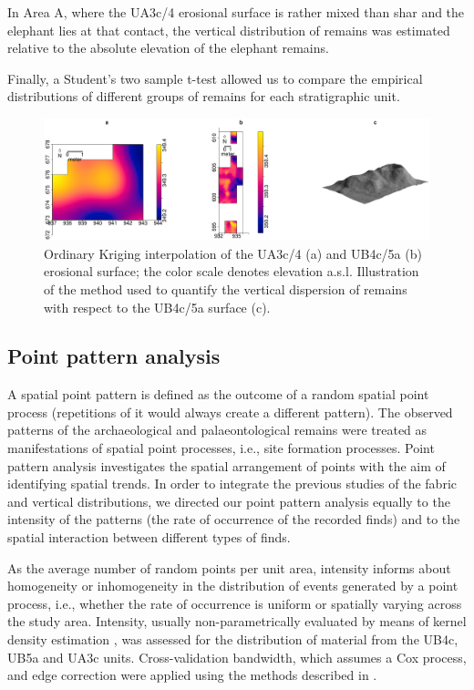\documentclass[preprint,authoryear,times]{elsarticle} %
\begin{document}
In Area A, where the UA3c/4 erosional surface is rather mixed than shar and the elephant lies at that contact, the vertical distribution of remains was estimated relative to the absolute elevation of the elephant remains.

Finally, a Student's two sample t-test allowed us to compare the empirical distributions of different groups of remains for each stratigraphic unit.

\begin{figure}[]
  \centering
  \includegraphics[width=1\textwidth]{../artwork/Fig5.eps}
  \caption{Ordinary Kriging interpolation of the UA3c/4 (a) and UB4c/5a (b) erosional surface; the color scale denotes elevation a.s.l. Illustration of the method used to quantify the vertical dispersion of remains with respect to the UB4c/5a surface (c).}
  \label{fig:5}
\end{figure}

\subsection{Point pattern analysis}

A spatial point pattern is defined as the outcome of a random spatial point process (repetitions of it would always create a different pattern). The observed patterns of the archaeological and palaeontological remains were treated as manifestations of spatial point processes, i.e., site formation processes. Point pattern analysis investigates the spatial arrangement of points with the aim of identifying spatial trends. In order to integrate the previous studies of the fabric and vertical distributions, we directed our point pattern analysis equally to the intensity of the patterns (the rate of occurrence of the recorded finds) and to the spatial interaction between different types of finds.

As the average number of random points per unit area, intensity informs about homogeneity or inhomogeneity in the distribution of events generated by a point process, i.e., whether the rate of occurrence is uniform or spatially varying across the study area. Intensity, usually non-parametrically evaluated by means of kernel density estimation \citep{Diggle1985}, was assessed for the distribution of material from the UB4c, UB5a and UA3c units. Cross-validation bandwidth, which assumes a Cox process, and edge correction were applied using the methods described in \cite{Diggle1985}.
\end{document}

